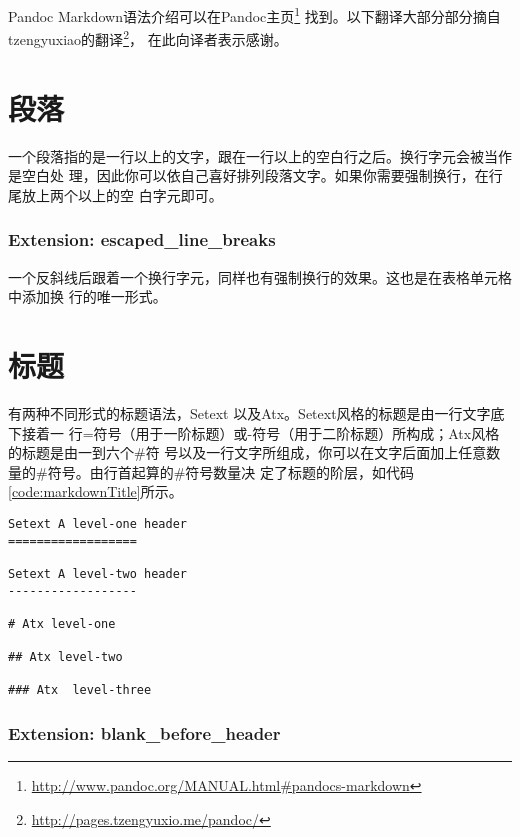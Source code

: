 \documentclass[fancyhdr,bookmark]{ctexbook}
\renewcommand{\href}[2]{#2\footnote{\url{#1}}}
\begin{document}
Pandoc
Markdown语法介绍可以在\href{http://www.pandoc.org/MANUAL.html\#pandocs-markdown}{Pandoc主页}
找到。以下翻译大部分部分摘自\href{http://pages.tzengyuxio.me/pandoc/}{tzengyuxiao的翻译}，
在此向译者表示感谢。

\hypertarget{ux6bb5ux843d}{%
\section{段落}\label{ux6bb5ux843d}}

一个段落指的是一行以上的文字，跟在一行以上的空白行之后。换行字元会被当作是空白处
理，因此你可以依自己喜好排列段落文字。如果你需要强制换行，在行尾放上两个以上的空
白字元即可。

\hypertarget{extension-escaped_line_breaks}{%
\subsubsection{Extension:
escaped\_line\_breaks}\label{extension-escaped_line_breaks}}

一个反斜线后跟着一个换行字元，同样也有强制换行的效果。这也是在表格单元格中添加换
行的唯一形式。

\hypertarget{ux6807ux9898}{%
\section{标题}\label{ux6807ux9898}}

有两种不同形式的标题语法，Setext
以及Atx。Setext风格的标题是由一行文字底下接着一
行=符号（用于一阶标题）或-符号（用于二阶标题）所构成；Atx风格的标题是由一到六个\#符
号以及一行文字所组成，你可以在文字后面加上任意数量的\#符号。由行首起算的\#符号数量决
定了标题的阶层，如代码\ref{code:markdownTitle}所示。

\begin{lstlisting}[caption=测试, label=code:markdownTitle, float=htbp]
Setext A level-one header
==================

Setext A level-two header
------------------

# Atx level-one

## Atx level-two

### Atx  level-three
\end{lstlisting}

\hypertarget{extension-blank_before_header}{%
\subsubsection{Extension:
blank\_before\_header}\label{extension-blank_before_header}}
\end{document}
